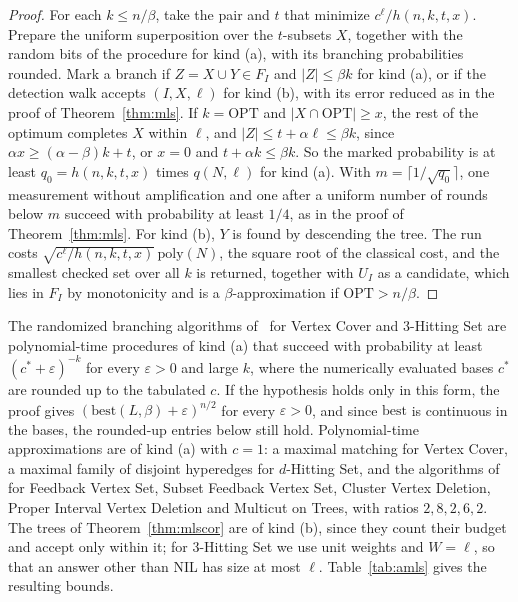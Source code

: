 \documentclass[11pt]{article}
\theoremstyle{remark}
\begin{document}
\begin{proof}
For each $k \le n/\beta$, take the pair and $t$ that minimize $c^\ell/h(n,k,t,x)$. Prepare the uniform superposition over the $t$-subsets $X$, together with the random bits of the procedure for kind (a), with its branching probabilities rounded. Mark a branch if $Z = X \cup Y \in F_I$ and $|Z| \le \beta k$ for kind (a), or if the detection walk accepts $(I, X, \ell)$ for kind (b), with its error reduced as in the proof of Theorem~\ref{thm:mls}. If $k = \mathrm{OPT}$ and $|X \cap \mathrm{OPT}| \ge x$, the rest of the optimum completes $X$ within $\ell$, and $|Z| \le t + \alpha\ell \le \beta k$, since $\alpha x \ge (\alpha - \beta)k + t$, or $x = 0$ and $t + \alpha k \le \beta k$. So the marked probability is at least $q_0 = h(n,k,t,x)$ times $q(N,\ell)$ for kind (a). With $m = \lceil 1/\sqrt{q_0} \rceil$, one measurement without amplification and one after a uniform number of rounds below $m$ succeed with probability at least $1/4$, as in the proof of Theorem~\ref{thm:mls}. For kind (b), $Y$ is found by descending the tree. The run costs $\sqrt{c^\ell/h(n,k,t,x)}\, \mathrm{poly}(N)$, the square root of the classical cost, and the smallest checked set over all $k$ is returned, together with $U_I$ as a candidate, which lies in $F_I$ by monotonicity and is a $\beta$-approximation if $\mathrm{OPT} > n/\beta$.
\end{proof}

The randomized branching algorithms of~\cite{KS20} for Vertex Cover and 3-Hitting Set are polynomial-time procedures of kind (a) that succeed with probability at least $(c^*+\varepsilon)^{-k}$ for every $\varepsilon > 0$ and large $k$, where the numerically evaluated bases $c^*$ are rounded up to the tabulated $c$. If the hypothesis holds only in this form, the proof gives $(\mathrm{best}(L,\beta)+\varepsilon)^{n/2}$ for every $\varepsilon > 0$, and since $\mathrm{best}$ is continuous in the bases, the rounded-up entries below still hold. Polynomial-time approximations are of kind (a) with $c = 1$: a maximal matching for Vertex Cover, a maximal family of disjoint hyperedges for $d$-Hitting Set, and the algorithms of~\cite{BBF99,ENZ00,ADFH23,vHV13,GVY97} for Feedback Vertex Set, Subset Feedback Vertex Set, Cluster Vertex Deletion, Proper Interval Vertex Deletion and Multicut on Trees, with ratios $2, 8, 2, 6, 2$. The trees of Theorem~\ref{thm:mlscor} are of kind (b), since they count their budget and accept only within it; for 3-Hitting Set we use unit weights and $W = \ell$, so that an answer other than NIL has size at most $\ell$. Table~\ref{tab:amls} gives the resulting bounds.
\end{document}
